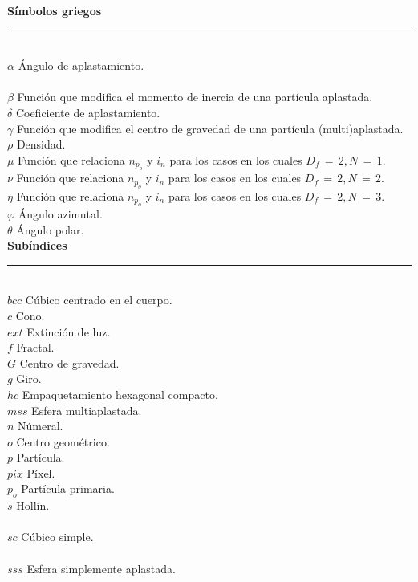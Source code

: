 {\Large \textbf{Símbolos griegos}}\\
\hrule
\normalsize
~        \hfill   ~\\
$\alpha$ \hfill Ángulo de aplastamiento.\\
\\
$\beta$ \hfill Función que modifica el momento de inercia de una partícula aplastada.\\
$\delta$ \hfill Coeficiente de aplastamiento.\\
$\gamma$ \hfill Función que modifica el centro de gravedad de una partícula (multi)aplastada.\\
$\rho$ \hfill Densidad.\\
$\mu$ \hfill Función que relaciona $n_{p_o}$ y $i_n$ para los casos en los cuales $D_f\,=\,2, N\,=\,1$.\\
$\nu$ \hfill Función que relaciona $n_{p_o}$ y $i_n$ para los casos en los cuales $D_f\,=\,2, N\,=\,2$.\\
$\eta$ \hfill Función que relaciona $n_{p_o}$ y $i_n$ para los casos en los cuales $D_f\,=\,2, N\,=\,3$.\\
$\varphi$ \hfill Ángulo azimutal.\\
$\theta$ \hfill Ángulo polar.\\

{\Large \textbf{Subíndices}}\\
\hrule
\normalsize
~        \hfill   ~\\
$bcc$ \hfill Cúbico centrado en el cuerpo.\\
$c$ \hfill Cono.\\
$ext$ \hfill Extinción de luz.\\
$f$ \hfill Fractal.\\
$G$ \hfill Centro de gravedad.\\
$g$ \hfill Giro.\\
$hc$ \hfill Empaquetamiento hexagonal compacto.\\
$mss$ \hfill Esfera multiaplastada.\\
$n$ \hfill Númeral.\\
$o$ \hfill Centro geométrico.\\
$p$ \hfill Partícula.\\
$pix$ \hfill Píxel.\\
$p_{o}$ \hfill Partícula primaria.\\
$s$ \hfill Hollín.\\
\\
$sc$ \hfill Cúbico simple.\\
\\
$sss$ \hfill Esfera simplemente aplastada.\\